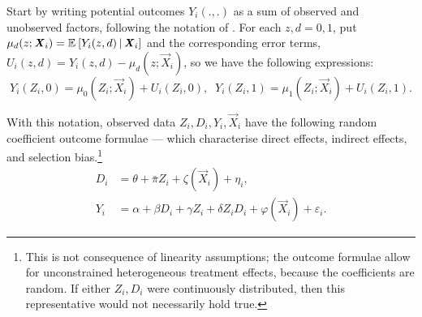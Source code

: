 Start by writing potential outcomes $Y_i(., .)$ as a sum of observed and unobserved factors, following the notation of \cite{heckman2005structural}.
For each $z,d = 0,1$, put $\mu_{d}(z; \boldsymbol{\mathit{X}}_i) = \mathbb{E}_{} \left[ Y_i(z, d) \, \middle\vert \, \boldsymbol{\mathit{X}}_i \right]$ and the corresponding error terms, $U_i(z,d) = Y_i(z, d) - \mu_{d}(z; \vec X_i)$, so we have the following expressions:
\[ Y_i(Z_i, 0)  = \mu_{0}(Z_i; \vec X_i) + U_i(Z_i, 0), \;\;
    Y_i(Z_i, 1) = \mu_{1}(Z_i; \vec X_i) + U_i(Z_i, 1). \]

With this notation, observed data $Z_i, D_i, Y_i, \vec X_i$ have the following random coefficient outcome formulae --- which characterise direct effects, indirect effects, and selection bias.\footnote{
    This is not consequence  of linearity assumptions; the outcome formulae allow for unconstrained heterogeneous treatment effects, because the coefficients are random.
    If either $Z_i, D_i$ were continuously distributed, then this representative would not necessarily hold true.
}
\begin{align}
    \label{eqn:parametric-firststage}
    D_i &= \theta + \bar \pi Z_i + \zeta(\vec X_i) + \eta_i,  \\
    \label{eqn:parametric-secondstage}
    Y_i &= \alpha + \beta D_i + \gamma Z_i + \delta Z_i D_i
    + \varphi(\vec X_i)
    + \varepsilon_i.
\end{align}

